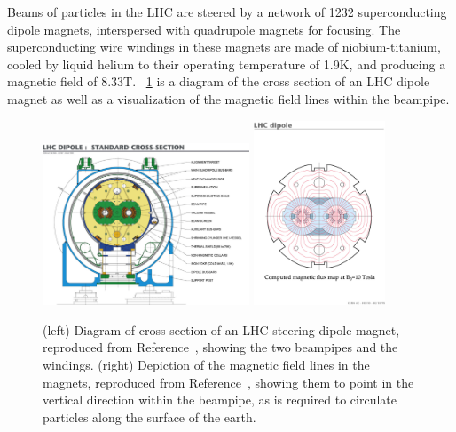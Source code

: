 Beams of particles in the LHC are steered by a network of 1232 superconducting dipole magnets, interspersed with quadrupole magnets for focusing.
The superconducting wire windings in these magnets are made of niobium-titanium, cooled by liquid helium to their operating temperature of 1.9\unit{K}, and producing a magnetic field of 8.33\unit{T}.
\Fig~\ref{cms:dipole} is a diagram of the cross section of an LHC dipole magnet as well as a visualization of the magnetic field lines within the beampipe.

\begin{figure}[tpb]
  \centering
  \includegraphics[width=0.55\textwidth]{figures/cms/DipoleCrossSection.jpeg}
  \includegraphics[width=0.35\textwidth]{figures/cms/FieldLines.jpg}
  \caption{(left) Diagram of cross section of an LHC steering dipole magnet, reproduced from Reference~\cite{Team:40524}, showing the two beampipes and the windings. (right) Depiction of the magnetic field lines in the magnets, reproduced from Reference~\cite{Jean-Luc:841503}, showing them to point in the vertical direction within the beampipe, as is required to circulate particles along the surface of the earth.}
  \label{cms:dipole}
\end{figure}

